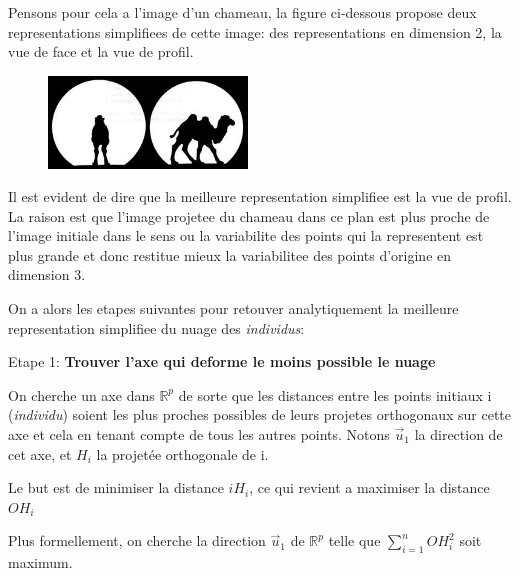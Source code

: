 \documentclass{article}
\begin{document}
Pensons pour cela a l’image d’un chameau, la figure ci-dessous propose deux
representations simplifiees de cette image: des representations en dimension 2, la vue de face et la vue de profil.

\begin{figure}[h!]
\centering
\includegraphics[width=200px]{images/chameau.png}
\end{figure}

Il est evident de dire que la meilleure representation simplifiee est la vue de profil. La raison est que l’image projetee du chameau dans ce plan est plus proche de l’image initiale dans le sens ou la variabilite des points qui la representent est plus grande et donc restitue mieux la variabilitee des points d’origine en dimension 3.
\newline

On a alors les etapes suivantes pour retouver analytiquement la meilleure representation simplifiee du nuage des \textit{individus}:

\begin{flushleft}
Etape 1: \textbf{Trouver l'axe qui deforme le moins possible le nuage}
\end{flushleft}

On cherche un axe dans $\mathbb{R}^p$ de sorte que les distances entre les points initiaux i (\textit{individu}) soient les plus proches possibles de leurs projetes orthogonaux sur cette axe et cela en tenant compte de tous les autres points. Notons $\vec{u}_1$ la direction de cet axe, et $H_i$ la projetée orthogonale de i.
\newline


Le but est de minimiser la distance $iH_i$, ce qui revient a maximiser la distance $OH_i$
\newline

Plus formellement, on cherche la direction $\vec{u}_1$ de $\mathbb{R}^p$ telle que $\sum_{i=1}^n OH_i^2$ soit maximum.
\newline
\end{document}
